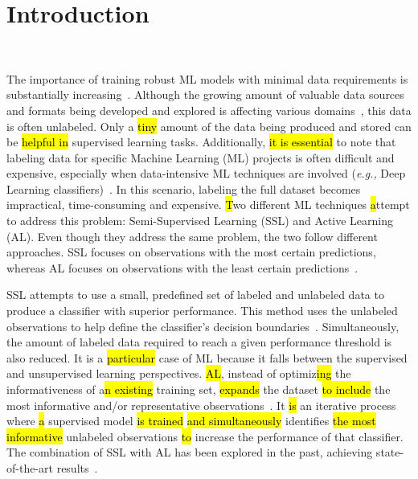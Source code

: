 \documentclass[preprint, 12pt]{elsarticle}
\begin{document}
\linenumbers%

\section{Introduction}~\label{sec:introduction}


The importance of training robust ML models with minimal data requirements is
substantially increasing~\cite{Nath2021, Sverchkov2017, Li2012}. Although the
growing amount of valuable data sources and formats being developed and
explored is affecting various domains~\cite{Li2021}, this data is often
unlabeled. Only a \hl{tiny} amount of the data being produced and stored can be
\hl{helpful in} supervised learning tasks. Additionally, \hl{it is essential} to
note that labeling data for specific Machine Learning (ML) projects is often
difficult and expensive, especially when data-intensive ML techniques are
involved (\textit{e.g.,} Deep Learning classifiers)~\cite{Nath2021}. In this
scenario, labeling the full dataset becomes impractical, time-consuming
and expensive. \hl{T}wo different ML techniques\hl{ a}ttempt to address this
problem: Semi-Supervised Learning (SSL) and Active Learning (AL). Even though
they address the same problem, the two follow different approaches. SSL
focuses on observations with the most certain predictions, whereas AL focuses
on observations with the least certain predictions~\cite{Simeoni2020}.

SSL attempts to use a small, predefined set of labeled and unlabeled data to
produce a classifier with superior performance. This method uses the unlabeled
observations to help define the classifier's decision
boundaries~\cite{Van2020}. Simultaneously, the amount of labeled data required
to reach a given performance threshold is also reduced. It is a
\hl{particular} case of ML because it falls between the supervised and
unsupervised learning perspectives. \hl{AL}, instead of optimiz\hl{ing} the
informativeness of a\hl{n existing} training set, \hl{expands} the dataset
\hl{to include} the most informative and/or representative
observations~\cite{Sener2018}. It \hl{is} an iterative process where \hl{a}
supervised model \hl{is trained} \hl{and simultaneously} identifies \hl{the
most informative} unlabeled observations\hl{ to} increase the performance of
that classifier. The combination of SSL with AL has been explored in the past,
achieving state-of-the-art results~\cite{Leng2013}.
 
\end{document}
